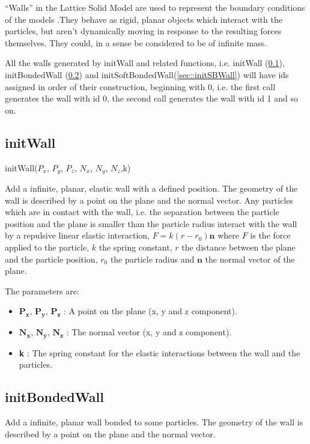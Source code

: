 \documentclass{report}
\begin{document}
``Walls'' in the Lattice Solid Model are used to represent the boundary conditions of the models .They behave as rigid, planar objects which interact with the particles, but aren't dynamically moving in response to the resulting forces themselves. They could, in a sense be considered to be of infinite mass.  \par
All the walls generated by initWall and related functions, i.e. initWall (\ref{sec::initWall}), initBondedWall (\ref{sec::initBondedWall}) and initSoftBondedWall(\ref{sec::initSBWall}) will have ids assigned in order of their construction, beginning with 0, i.e. the first call generates the wall with id 0, the second call generates the wall with id 1 and so on.

\subsection{initWall}
\label{sec::initWall}

\textsf{initWall($P_x$, $P_y$, $P_z$, $N_x$, $N_y$, $N_z$,k)}
\par \medskip
Add a infinite, planar, elastic wall with a defined position. The geometry of the wall is described by a point on the plane and the normal vector. Any particles which are in contact with the wall, i.e. the separation between the particle position and the plane is smaller than the particle radius interact with the wall by a repulsive linear elastic interaction, $F=k(r-r_0)\mathbf{n}$ where $F$ is the force applied to the particle, $k$ the spring constant, $r$ the distance between the plane and the particle position, $r_0$ the particle radius and $\mathbf{n}$ the normal vector of the plane. \par
The parameters are:
\begin{itemize}
\item $\mathbf{P_x}$, $\mathbf{P_y}$, $\mathbf{P_z}$ : A point on the plane (x, y and z component).
\item $\mathbf{N_x}$, $\mathbf{N_y}$, $\mathbf{N_z}$ : The normal vector (x, y and z component).
\item \textbf{k} : The spring constant for the elastic interactions between the wall and the particles.
\end{itemize}

\subsection{initBondedWall}
\label{sec::initBondedWall}
Add a infinite, planar wall bonded to some particles. The geometry of the wall is described by a point on the plane and the normal vector. 
\end{document}
